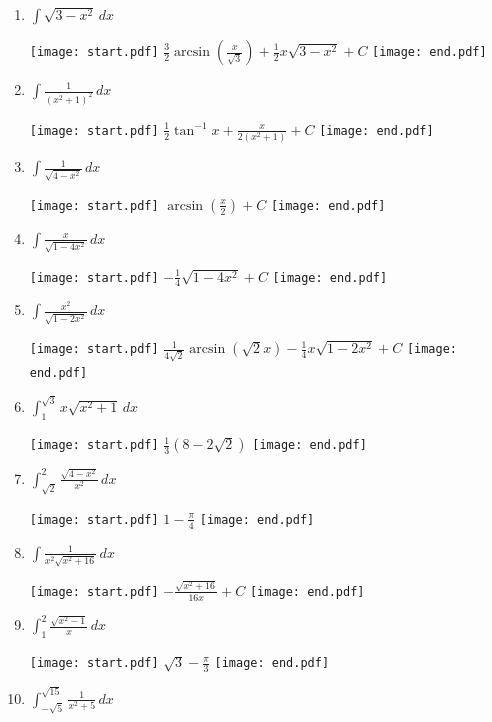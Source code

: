 \documentclass[12pt]{article}
\begin{document}
\begin{enumerate}

\item $\int \sqrt{3-x^2}\,dx$ 

\texttt{[image: start.pdf]}
{{$\frac{3}{2}\arcsin{\left(\frac{x}{\sqrt{3}}\right)}+\frac{1}{2}x\sqrt{3-x^2}+C$}}
\texttt{[image: end.pdf]}


\item $\int \frac{1}{(x^2+1)^2}\,dx$ 

\texttt{[image: start.pdf]}
{{$\frac{1}{2}\tan^{-1}{x}+\frac{x}{2(x^2+1)}+C$}}
\texttt{[image: end.pdf]}


\item $\int \frac{1}{\sqrt{4-x^2}}\,dx$ 

\texttt{[image: start.pdf]}
{{$\arcsin{\left(\frac{x}{2}\right)+C}$}}
\texttt{[image: end.pdf]}


\item $\int \frac{x}{\sqrt{1-4x^2}}\,dx$ 

\texttt{[image: start.pdf]}
{{$-\frac{1}{4}\sqrt{1-4x^2}+C$}}
\texttt{[image: end.pdf]}


\item $\int \frac{x^2}{\sqrt{1-2x^2}}\,dx$ 

\texttt{[image: start.pdf]}
{{$\frac{1}{4\sqrt{2}}\arcsin{(\sqrt{2}x)}-\frac{1}{4}x\sqrt{1-2x^2}+C$}}
\texttt{[image: end.pdf]}


\item $\int^{\sqrt{3}}_1 x\sqrt{x^2+1}\,dx$ 

\texttt{[image: start.pdf]}
{{$\frac{1}{3}(8-2\sqrt{2})$}}
\texttt{[image: end.pdf]}


\item $\int^2_{\sqrt{2}} \frac{\sqrt{4-x^2}}{x^2}\,dx$ 

\texttt{[image: start.pdf]}
{{$1-\frac{\pi}{4}$}}
\texttt{[image: end.pdf]}


\item $\int \frac{1}{x^2\sqrt{x^2+16}}\,dx$ 

\texttt{[image: start.pdf]}
{{$-\frac{\sqrt{x^2+16}}{16x}+C$}}
\texttt{[image: end.pdf]}


\item $\int_1^2 \frac{\sqrt{x^2-1}}{x}\,dx$ 

\texttt{[image: start.pdf]}
{{$\sqrt{3}-\frac{\pi}{3}$}}
\texttt{[image: end.pdf]}


\item $\int_{-\sqrt{5}}^{\sqrt{15}} \frac{1}{x^2+5}\,dx$ 


\end{enumerate}
\end{document}

